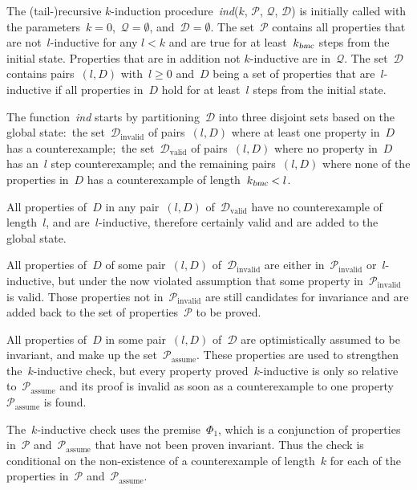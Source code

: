 \documentclass[12pt]{article}
\renewcommand{\textproc}{\textsl}
\begin{document}
The (tail-)recursive $k$\nobreakdash-induction procedure~\textproc{ind}($k$, $\mathcal{P}$, $\mathcal{Q}$, $\mathcal{D}$) is initially called with the parameters~${k = 0}$,~${\mathcal{Q} = \emptyset}$, and~${\mathcal{D} = \emptyset}$. The set~$\mathcal{P}$ contains all properties that are not~$l$\nobreakdash-inductive for any $l < k$ and are true for at least~$k_\textproc{bmc}$ steps from the initial state. Properties that are in addition not $k$\nobreakdash-inductive are in~$\mathcal{Q}$. The set~$\mathcal{D}$ contains pairs~$(l,D)$ with~${l \geq 0}$ and~$D$ being a set of properties that are~$l$\nobreakdash-inductive if all properties in~$D$ hold for at least~$l$ steps from the initial state.

The function~\textproc{ind} starts by partitioning~$\mathcal{D}$ into three disjoint sets based on the global state:~the set~$\mathcal{D}_\mathrm{invalid}$ of pairs~$(l,D)$ where at least one property in~$D$ has a counterexample;~the set~$\mathcal{D}_\mathrm{valid}$ of pairs~$(l,D)$ where no property in~$D$ has an~$l$ step counterexample; and the remaining pairs~$(l,D)$ where none of the properties in~$D$ has a counterexample of length~$k_\textproc{bmc} < l$. 

All properties of~$D$ in any pair~$(l,D)$ of~$\mathcal{D}_\mathrm{valid}$ have no counterexample of length~$l$, and are~$l$\nobreakdash-inductive, therefore  certainly valid and are added to the global state. 

All properties of~$D$ of some pair~$(l,D)$ of~$\mathcal{D}_\mathrm{invalid}$ are either in~$\mathcal{P}_\mathrm{invalid}$ or~$l$\nobreakdash-inductive, but under the now violated assumption that some property in~$\mathcal{P}_\mathrm{invalid}$ is valid. Those properties not in~$\mathcal{P}_\mathrm{invalid}$ are still candidates for invariance and are added back to the set of properties~$\mathcal{P}$ to be proved.

All properties of~$D$ in some pair~$(l,D)$ of~$\mathcal{D}$ are optimistically assumed to be invariant, and make up the set~$\mathcal{P}_\mathrm{assume}$. These properties are used to strengthen the~$k$\nobreakdash-inductive check, but every property proved~$k$\nobreakdash-inductive is only so relative to~$\mathcal{P}_\mathrm{assume}$ and its proof is invalid as soon as a counterexample to one property~$\mathcal{P}_\mathrm{assume}$ is found.

The~$k$\nobreakdash-inductive check uses the premise~$\Phi_1$, which is a conjunction of properties in~$\mathcal{P}$ and~$\mathcal{P}_\mathrm{assume}$ that have not been proven invariant. Thus the check is conditional on the non-existence of a counterexample of length~$k$ for each of the properties in~$\mathcal{P}$ and~$\mathcal{P}_\mathrm{assume}$.
\end{document}
